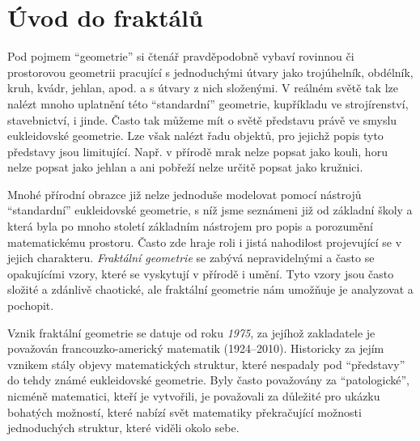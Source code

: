 \chapter{Úvod do fraktálů}\label{chapter:uvod_do_fraktalu}

Pod pojmem ``geometrie'' si čtenář pravděpodobně vybaví rovinnou či prostorovou geometrii pracující s jednoduchými útvary jako trojúhelník, obdélník, kruh, kvádr, jehlan, apod. a s útvary z nich složenými. V reálném světě tak lze nalézt mnoho uplatnění této ``standardní'' geometrie, kupříkladu ve strojírenství, stavebnictví, i jinde. Často tak můžeme mít o světě představu právě ve smyslu eukleidovské geometrie. Lze však nalézt řadu objektů, pro jejichž popis tyto představy jsou limitující. Např. v přírodě mrak nelze popsat jako kouli, horu nelze popsat jako jehlan a ani pobřeží nelze určitě popsat jako kružnici.\par

Mnohé přírodní obrazce již nelze jednoduše modelovat pomocí nástrojů ``standardní'' eukleidovské geometrie, s níž jsme seznámeni již od základní školy a která byla po mnoho století základním nástrojem pro popis a porozumění matematickému prostoru. Často zde hraje roli i jistá nahodilost projevující se v jejich charakteru. \emph{Fraktální geometrie} se zabývá nepravidelnými a často se opakujícími vzory, které se vyskytují v přírodě i umění. Tyto vzory jsou často složité a zdánlivě chaotické, ale fraktální geometrie nám umožňuje je analyzovat a pochopit.\par

Vznik fraktální geometrie se datuje od roku \emph{1975}, za jejíhož zakladatele je považován francouzko-americký matematik  \mbox{(1924--2010)}. Historicky za jejím vznikem stály objevy matematických struktur, které nespadaly pod ``představy'' do tehdy známé eukleidovské geometrie. Byly často považovány za ``patologické'', nicméně matematici, kteří je vytvořili, je považovali za důležité pro ukázku bohatých možností, které nabízí svět matematiky překračující možnosti jednoduchých struktur, které viděli okolo sebe. \citep[str. 33]{Mandelbrot1983}




